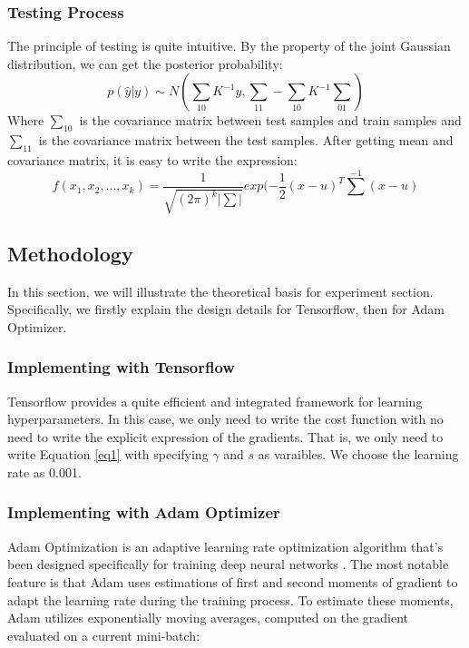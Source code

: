 \documentclass{article}
\begin{document}
 \subsubsection{Testing Process}
 The principle of testing is quite intuitive. By the property of the joint Gaussian distribution, we can get the posterior probability:
 \begin{equation}
 p(\hat{y}|{y})\sim N(\sum_{10}K^{-1}y,\sum_{11}-\sum_{10}K^{-1}\sum_{01})
 \end{equation}
 Where $\sum_{10}$ is the covariance matrix between test samples and train samples and $\sum_{11}$ is the covariance matrix between the test samples. After getting mean and covariance matrix, it is easy to write the expression:
 \begin{equation}
 f(x_1,x_2,...,x_k)=\frac{1}{\sqrt{(2\pi)^k|\sum|}} exp(-\frac{1}{2}(x-u)^T\sum^{-1}(x-u)
 \end{equation}
 
 
\subsection{Methodology}
In this section, we will illustrate the theoretical basis for experiment section. Specifically, we firstly explain the design details for Tensorflow, then for Adam Optimizer.  
\subsubsection{Implementing with Tensorflow}
Tensorflow provides a quite efficient and integrated framework for learning hyperparameters. In this case, we only need to write the cost function with no need to write the explicit expression of the gradients. That is, we only need to write Equation \ref{eq1} with specifying $\gamma$ and $s$ as varaibles. We choose the learning rate as 0.001.

\subsubsection{Implementing with Adam Optimizer}
Adam Optimization is an adaptive learning rate optimization algorithm that’s been designed specifically for training deep neural networks \cite{8}. The most notable feature is that Adam uses estimations of first and second moments of gradient to adapt the learning rate during the training process. To estimate these moments, Adam utilizes exponentially moving averages, computed on the gradient evaluated on a current mini-batch:
\end{document}
